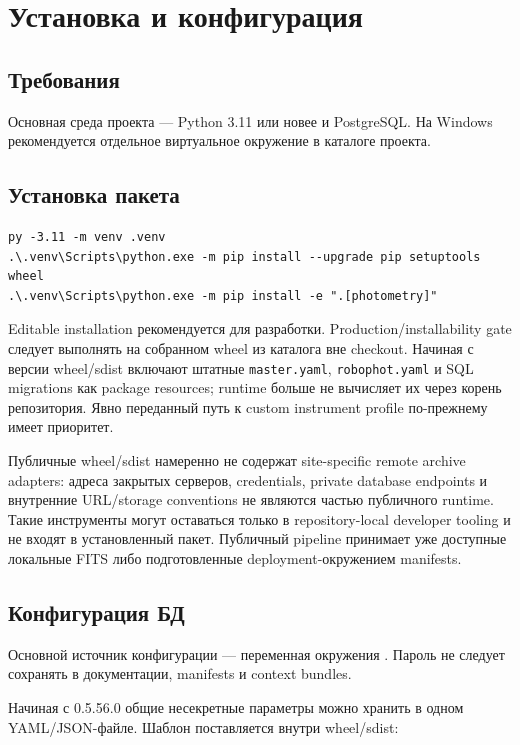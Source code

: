 \chapter{Установка и конфигурация}

\section{Требования}

Основная среда проекта --- Python 3.11 или новее и PostgreSQL. На Windows рекомендуется отдельное виртуальное окружение в каталоге проекта.

\section{Установка пакета}

\begin{lstlisting}
py -3.11 -m venv .venv
.\.venv\Scripts\python.exe -m pip install --upgrade pip setuptools wheel
.\.venv\Scripts\python.exe -m pip install -e ".[photometry]"
\end{lstlisting}

Editable installation рекомендуется для разработки. Production/installability gate следует выполнять на собранном wheel из каталога вне checkout. Начиная с версии \manualversion{} wheel/sdist включают штатные \texttt{master.yaml}, \texttt{robophot.yaml} и SQL migrations как package resources; runtime больше не вычисляет их через корень репозитория. Явно переданный путь к custom instrument profile по-прежнему имеет приоритет.

Публичные wheel/sdist намеренно не содержат site-specific remote archive adapters: адреса закрытых серверов, credentials, private database endpoints и внутренние URL/storage conventions не являются частью публичного runtime. Такие инструменты могут оставаться только в repository-local developer tooling и не входят в установленный пакет. Публичный pipeline принимает уже доступные локальные FITS либо подготовленные deployment-окружением manifests.

\section{Конфигурация БД}

Основной источник конфигурации --- переменная окружения . Пароль не следует сохранять в документации, manifests и context bundles.


Начиная с 0.5.56.0 общие несекретные параметры можно хранить в одном YAML/JSON-файле. Шаблон поставляется внутри wheel/sdist:

